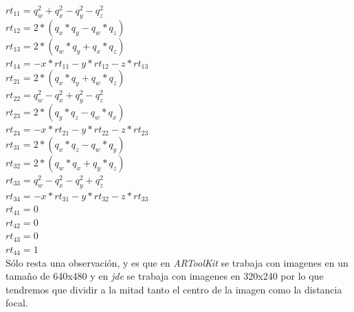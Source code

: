 \documentclass[a4paper,12pt,notitlepage,openany]{article}
\begin{document}
$ rt_{11}= q_w^2 + q_x^2 - q_y^2 - q_z^2 $\\
$ rt_{12}= 2 * (q_x*q_y - q_w*q_z)$\\
$ rt_{13}= 2 * (q_w*q_y + q_x*q_z)$\\
$ rt_{14}= -x * rt_{11} - y * rt_{12} - z * rt_{13}$\\
$ rt_{21}= 2 * (q_x*q_y + q_w*q_z)$\\
$ rt_{22}= q_w^2 - q_x^2 + q_y^2 - q_z^2$\\
$ rt_{23}= 2 * (q_y*q_z - q_w*q_x)$\\
$ rt_{24}= -x * rt_{21} - y * rt_{22} - z * rt_{23}$\\
$ rt_{31}= 2 * (q_x*q_z - q_w*q_y)$\\
$ rt_{32}= 2 * (q_w*q_x + q_y*q_z)$\\
$ rt_{33}= q_w^2 - q_x^2 - q_y^2 + q_z^2$\\
$ rt_{34}= -x * rt_{31} - y * rt_{32} - z * rt_{33}$\\
$ rt_{41}= 0$\\
$ rt_{42}= 0$\\
$ rt_{43}= 0$\\
$ rt_{44}= 1$\\


S\'{o}lo resta una observaci\'{o}n, y es que en \textit{ARToolKit} se trabaja con imagenes en un tama\~{n}o de 640x480 y en \textit{jde} se trabaja con imagenes en 320x240 por lo que tendremos que dividir a la mitad tanto el centro de la imagen como la distancia focal.


\nocite{*}
%
\end{document}
